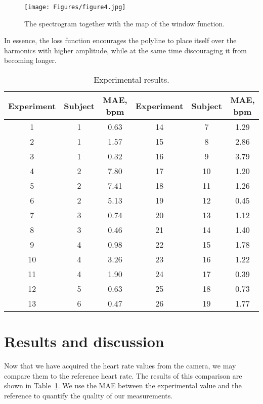 \begin{figure}[htbp]
    \centering
    \texttt{[image: Figures/figure4.jpg]}
    \caption{The spectrogram together with the map of the window function.}
    \label{fig:4}
\end{figure}

In essence, the loss function encourages the polyline to place itself over the harmonics with higher amplitude, while at the same time discouraging it from becoming longer.

\begin{table}
    \caption{Experimental results.}
    \label{tab:1}
    \centering
    \begin{tabular}{||c|c|c||c|c|c||}
        \hline
        Experiment & Subject & MAE, bpm & Experiment & Subject & MAE, bpm \\
        \hline
        1 & 1 & 0.63 & 14 & 7 & 1.29 \\
        \hline
        2 & 1 & 1.57 & 15 & 8 & 2.86 \\
        \hline
        3 & 1 & 0.32 & 16 & 9 & 3.79 \\
        \hline
        4 & 2 & 7.80 & 17 & 10 & 1.20 \\
        \hline
        5 & 2 & 7.41 & 18 & 11 & 1.26 \\
        \hline
        6 & 2 & 5.13 & 19 & 12 & 0.45 \\
        \hline
        7 & 3 & 0.74 & 20 & 13 & 1.12 \\
        \hline
        8 & 3 & 0.46 & 21 & 14 & 1.40 \\
        \hline
        9 & 4 & 0.98 & 22 & 15 & 1.78 \\
        \hline
        10 & 4 & 3.26 & 23 & 16 & 1.22 \\
        \hline
        11 & 4 & 1.90 & 24 & 17 & 0.39 \\
        \hline
        12 & 5 & 0.63 & 25 & 18 & 0.73 \\
        \hline
        13 & 6 & 0.47 & 26 & 19 & 1.77 \\
        \hline
    \end{tabular}
\end{table}

\section{Results and discussion}\label{results}

Now that we have acquired the heart rate values from the camera, we may compare them to the reference heart rate. The results of this comparison are shown in Table~\ref{tab:1}. We use the MAE between the experimental value and the reference to quantify the quality of our measurements. 

